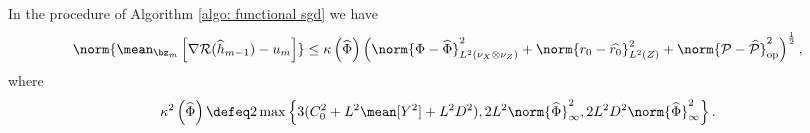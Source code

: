 \begin{lemma}
    \label{lem: bound u_m - grad}
    In the procedure of Algorithm \ref{algo: functional sgd} we have
    \begin{equation*}
        \norm{
            \mean_{ \bz_{ m } } \left[
                \nabla \risk ( \hat{ h }_{ m-1 } ) - u_{ m }
            \right]
        }
        \leq
        \kappa \left( \hat{ \Phi } \right) \left(
            \norm{ \Phi - \hat{ \Phi } }_{ L^{ 2 } ( \nu_{ X } \otimes \nu_{ Z } ) }^2 + \norm{ r_{ 0 } - \hat{ r_{ 0 } } }_{ L^2 ( Z ) }^2 + \norm{ \meanop - \hat{ \meanop } }_{ \op }^2
        \right)^{ \frac{ 1 }{ 2 } }
    ,\end{equation*}
    where
    \begin{equation*}
        \kappa^2 \left( \hat{ \Phi } \right) \defeq 2 \max \left\{
            3 ( C_{ 0 }^2 + L^2 \mean [ Y^2 ] + L^2 D^2 ),
            2L^2 \norm{ \hat{ \Phi } }_{ \infty }^2,
            2L^2 D^2 \norm{ \hat{ \Phi } }_{ \infty }^2
        \right\}
    .\end{equation*}
\end{lemma}
